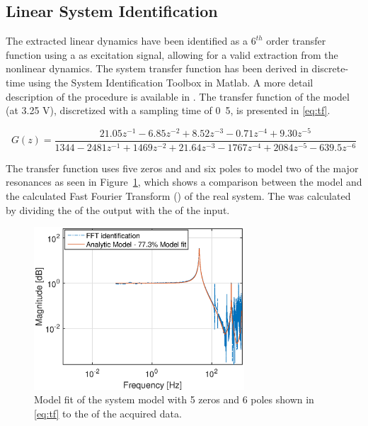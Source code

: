 \subsection{Linear System Identification}
\label{sec:linsys}
The extracted linear dynamics have been identified as a $6^{th}$ order transfer function using a \abbrPRBS as excitation signal, allowing for a valid extraction from the nonlinear dynamics. The system transfer function has been derived in discrete-time using the System Identification Toolbox in Matlab. A more detail description of the procedure is available in \citep{ButcherController:2015}. The transfer function of the model (at 3.25 V), discretized with a sampling time of \unit{0.5}{\milli\second}, is presented in \eqref{eq:tf}.

\begin{equation}
  \label{eq:tf}
  G(z) = \frac{21.05z^{-1} - 6.85z^{-2} + 8.52z^{-3} - 0.71z^{-4} + 9.30z^{-5}}{1344 - 2481z^{-1} + 1469z^{-2} + 21.64z^{-3} - 1767z^{-4} + 2084z^{-5} - 639.5z^{-6}}
\end{equation}

The transfer function uses five zeros and and six poles to model two of the major resonances as seen in Figure~\ref{fig:model}, which shows a comparison between the model and the calculated Fast Fourier Transform (\abbrFFT) of the real system. The \abbrFFT was calculated by dividing the \abbrFFT of the output with the \abbrFFT of the input.

\begin{figure}[h!]
  \centering
  \includegraphics[width=0.7\textwidth]{fig/matlab/model.eps}
  \caption{\label{fig:model} Model fit of the system model with 5 zeros and 6 poles shown in \eqref{eq:tf} to the \abbrFFT of the acquired data.}
\end{figure}

\FloatBarrier
